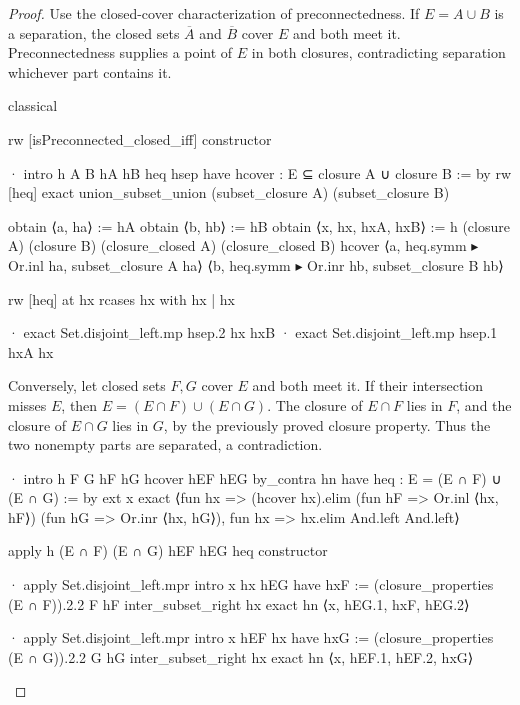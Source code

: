 \begin{proof}
  Use the closed-cover characterization of preconnectedness.
  If $E=A\cup B$ is a separation, the closed sets $\overline A$ and $\overline B$ cover $E$ and
  both meet it.
  Preconnectedness supplies a point of $E$ in both closures, contradicting separation whichever
  part contains it.

  \begin{lean}
    classical

    rw [isPreconnected_closed_iff]
    constructor

    · intro h A B hA hB heq hsep
      have hcover : E ⊆ closure A ∪ closure B := by
        rw [heq]
        exact union_subset_union (subset_closure A) (subset_closure B)

      obtain ⟨a, ha⟩ := hA
      obtain ⟨b, hb⟩ := hB
      obtain ⟨x, hx, hxA, hxB⟩ := h (closure A) (closure B)
        (closure_closed A) (closure_closed B) hcover
        ⟨a, heq.symm ▸ Or.inl ha, subset_closure A ha⟩
        ⟨b, heq.symm ▸ Or.inr hb, subset_closure B hb⟩

      rw [heq] at hx
      rcases hx with hx | hx

      · exact Set.disjoint_left.mp hsep.2 hx hxB
      · exact Set.disjoint_left.mp hsep.1 hxA hx
  \end{lean}

  Conversely, let closed sets $F,G$ cover $E$ and both meet it.
  If their intersection misses $E$, then $E=(E\cap F)\cup(E\cap G)$.
  The closure of $E\cap F$ lies in $F$, and the closure of $E\cap G$ lies in $G$, by the previously
  proved closure property.
  Thus the two nonempty parts are separated, a contradiction.

  \begin{lean}
    · intro h F G hF hG hcover hEF hEG
      by_contra hn
      have heq : E = (E ∩ F) ∪ (E ∩ G) := by
        ext x
        exact ⟨fun hx => (hcover hx).elim (fun hF => Or.inl ⟨hx, hF⟩)
          (fun hG => Or.inr ⟨hx, hG⟩), fun hx => hx.elim And.left And.left⟩

      apply h (E ∩ F) (E ∩ G) hEF hEG heq
      constructor

      · apply Set.disjoint_left.mpr
        intro x hx hEG
        have hxF := (closure_properties (E ∩ F)).2.2 F hF inter_subset_right hx
        exact hn ⟨x, hEG.1, hxF, hEG.2⟩

      · apply Set.disjoint_left.mpr
        intro x hEF hx
        have hxG := (closure_properties (E ∩ G)).2.2 G hG inter_subset_right hx
        exact hn ⟨x, hEF.1, hEF.2, hxG⟩
  \end{lean}
\end{proof}

